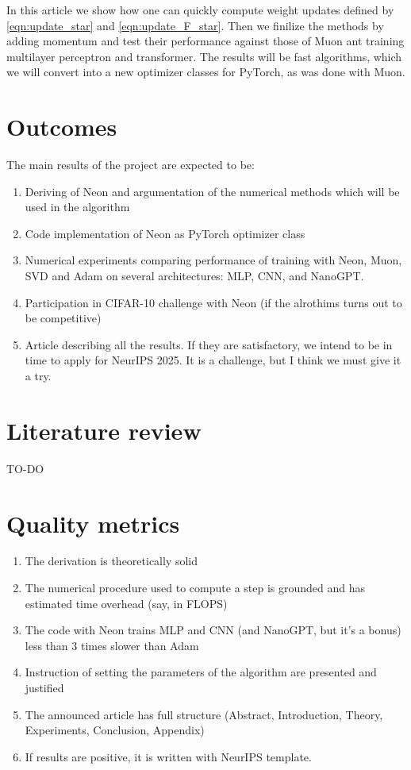 \documentclass[]{scrartcl}
\begin{document}
In this article we show how one can quickly compute weight updates defined by \eqref{eqn:update_star} and \eqref{eqn:update_F_star}. Then we finilize the methods by adding momentum and test their performance against those of Muon ant training multilayer perceptron and transformer. The results will be fast algorithms, which we will convert into a new optimizer classes for PyTorch, as was done with Muon.

\section{Outcomes}
The main results of the project are expected to be:
\begin{enumerate}
    \item Deriving of Neon and argumentation of the numerical methods which will be used in the algorithm
    \item Code implementation of Neon as PyTorch optimizer class
    \item Numerical experiments comparing performance of training with Neon, Muon, SVD and Adam on several architectures: MLP, CNN, and NanoGPT.
    \item Participation in CIFAR-10 challenge with Neon (if the alrothims turns out to be competitive)
    \item Article describing all the results. If they are satisfactory, we intend to be in time to apply for NeurIPS 2025. It is a challenge, but I think we must give it a try.
\end{enumerate}

\section{Literature review}
TO-DO

\section{Quality metrics}
\begin{enumerate}
    \item The derivation is theoretically solid
    \item The numerical procedure used to compute a step is grounded and has estimated time overhead (say, in FLOPS)
    \item The code with Neon trains MLP and CNN (and NanoGPT, but it's a bonus) less than 3 times slower than Adam
    \item Instruction of setting the parameters of the algorithm are presented and justified
    \item The announced article has full structure (Abstract, Introduction, Theory, Experiments, Conclusion, Appendix)
    \item If results are positive, it is written with NeurIPS template.
\end{enumerate}
\end{document}
